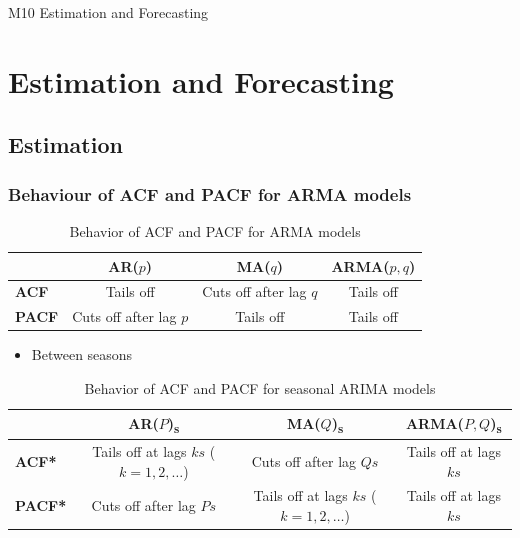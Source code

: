 \documentclass{article}
\begin{document}
\pagebreak

\begin{center}
    \Large{M10 Estimation and Forecasting}
\end{center}
    

\section{Estimation and Forecasting}

\subsection{Estimation}
\subsubsection{Behaviour of ACF and PACF for ARMA models}

\begin{table}[h!]
\centering
\begin{tabular}{@{}lccc@{}}
\toprule
        & \textbf{AR($p$)} 
        & \textbf{MA($q$)} 
        & \textbf{ARMA($p,q$)} \\
\midrule
\textbf{ACF}  & Tails off 
              & Cuts off after lag $q$ 
              & Tails off \\
\textbf{PACF} & Cuts off after lag $p$ 
              & Tails off 
              & Tails off \\
\bottomrule
\end{tabular}
\caption{Behavior of ACF and PACF for ARMA models}
\end{table}

\begin{itemize}
    \item Between seasons
\end{itemize}

\begin{table}[h!]
\centering
\begin{tabular}{@{}lccc@{}}
\toprule
        & \textbf{AR($P$)\textsubscript{s}} 
        & \textbf{MA($Q$)\textsubscript{s}} 
        & \textbf{ARMA($P,Q$)\textsubscript{s}} \\
\midrule
\textbf{ACF*}  & Tails off at lags $ks$ ($k=1,2,\dots$) 
              & Cuts off after lag $Qs$ 
              & Tails off at lags $ks$ \\
\textbf{PACF*} & Cuts off after lag $Ps$ 
              & Tails off at lags $ks$ ($k=1,2,\dots$) 
              & Tails off at lags $ks$ \\
\bottomrule
\end{tabular}
\caption{Behavior of ACF and PACF for seasonal ARIMA models}
\end{table}
\end{document}
